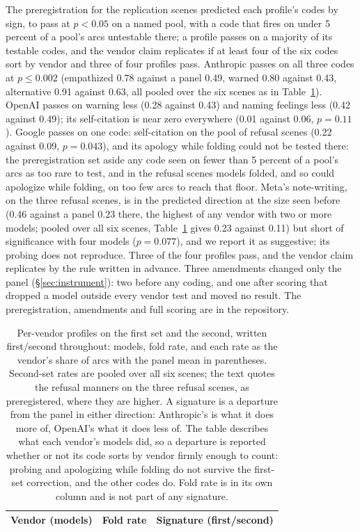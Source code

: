 \documentclass[11pt]{article}
\begin{document}
The preregistration for the replication scenes predicted each profile's codes by sign, to pass at
$p<0.05$ on a named pool, with a code that fires on under 5 percent of a pool's arcs untestable
there; a profile passes on a majority of its testable codes, and the vendor claim replicates if at
least four of the six codes sort by vendor and three of four profiles pass. Anthropic passes on all
three codes at $p\leq0.002$ (empathized 0.78 against a panel 0.49, warned 0.80 against 0.43,
alternative 0.91 against 0.63, all pooled over the six scenes as in Table~\ref{tab:profiles}). OpenAI
passes on warning less (0.28 against 0.43) and naming feelings less (0.42 against 0.49); its self-citation is near zero everywhere (0.01 against 0.06,
$p=0.11$). Google passes on one code: self-citation on the pool of refusal scenes (0.22 against 0.09,
$p=0.043$), and its apology while folding could not be tested there: the preregistration set aside any code
seen on fewer than 5 percent of a pool's arcs as too rare to test, and in the refusal scenes
models folded, and so could apologize while folding, on too few arcs to reach that floor. Meta's note-writing, on the three refusal scenes, is in the predicted direction at the size
seen before (0.46 against a panel 0.23 there, the highest of any vendor with two or more models;
pooled over all six scenes, Table~\ref{tab:profiles} gives 0.23 against 0.11) but short of significance with four models
($p=0.077$), and we report it as suggestive; its probing does
not reproduce. Three of the four profiles pass, and the vendor claim replicates by the rule written
in advance. Three amendments changed only the panel (\S\ref{sec:instrument}): two before any coding, and one
after scoring that dropped a model outside every vendor test and moved no result. The
preregistration, amendments and full scoring are in the repository.

\begin{table}[t]
\centering\small
\caption{Per-vendor profiles on the first set and the
second, written first/second throughout: models, fold rate, and each rate as the vendor's share
of arcs with the panel mean in parentheses. Second-set rates are pooled over all six scenes; the
text quotes the refusal manners on the three refusal scenes, as preregistered, where they are higher. A
signature is a departure from the panel in either direction: Anthropic's is what it does more of,
OpenAI's what it does less of. The table describes what each vendor's models did, so a departure is
reported whether or not its code sorts by vendor firmly enough to count: probing and apologizing
while folding do not survive the first-set correction, and the other codes do. Fold rate is in its own
column and is not part of any signature.}
\label{tab:profiles}
\begin{tabular}{lrp{7.6cm}}
\toprule
Vendor (models) & Fold rate & Signature (first/second) \\
\midrule

\end{tabular}
\end{table}
\end{document}
